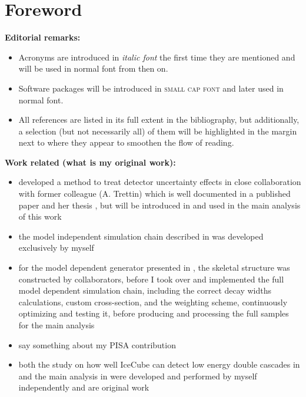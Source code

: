 \chapter*{Foreword}

\textbf{Editorial remarks:}
\begin{itemize}
    \item Acronyms are introduced in \textit{italic font} the first time they are mentioned and will be used in normal font from then on.
    \item Software packages will be introduced in \textsc{small cap font} and later used in normal font. 
    \item All references are listed in its full extent in the bibliography, but additionally, a selection (but not necessarily all) of them will be highlighted in the margin next to where they appear to smoothen the flow of reading.
\end{itemize}


\textbf{Work related (what is my original work):}
\begin{itemize}
    \item developed a method to treat detector uncertainty effects in close collaboration with former colleague (A. Trettin) which is well documented in a published paper and her thesis
    , but will be introduced in  and used in the main analysis of this work
    \item the model independent simulation chain described in  was developed exclusively by myself
    \item for the model dependent generator presented in , the skeletal structure was constructed by collaborators, before I took over and implemented the full model dependent simulation chain, including the correct decay widths calculations, custom cross-section, and the weighting scheme, continuously optimizing and testing it, before producing and processing the full samples for the main analysis
    \item say something about my PISA contribution
    \item both the study on how well IceCube can detect low energy double cascades in  and the main analysis in  were developed and performed by myself independently and are original work
\end{itemize}
